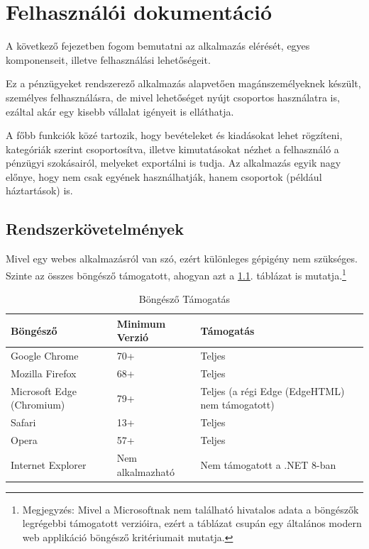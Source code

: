 \chapter{Felhasználói dokumentáció}
\label{ch:user}

A következő fejezetben fogom bemutatni az alkalmazás elérését, egyes komponenseit, illetve felhasználási lehetőségeit. 

Ez a pénzügyeket rendszerező alkalmazás alapvetően magánszemélyeknek készült, személyes felhasználásra, de mivel lehetőséget nyújt csoportos használatra is, ezáltal akár egy kisebb vállalat igényeit is elláthatja.

A főbb funkciók közé tartozik, hogy bevételeket és kiadásokat lehet rögzíteni, kategóriák szerint csoportosítva, illetve kimutatásokat nézhet a felhasználó a pénzügyi szokásairól, melyeket exportálni is tudja. Az alkalmazás egyik nagy előnye, hogy nem csak egyének használhatják, hanem csoportok (például háztartások) is.


\section{Rendszerkövetelmények}

Mivel egy webes alkalmazásról van szó, ezért különleges gépigény nem szükséges. Szinte az összes böngésző támogatott, ahogyan azt a \ref{tab:browsers}. táblázat is mutatja.\footnote{Megjegyzés: Mivel a Microsoftnak nem található hivatalos adata a böngészők legrégebbi támogatott verzióira, ezért a táblázat csupán egy általános modern web applikáció böngésző kritériumait mutatja.}
\begin{table}[H]
	\centering
	\begin{tabular}{ | m{} | m{} | m{} | }
		\hline
		\textbf{Böngésző} & \textbf{Minimum Verzió} & \textbf{Támogatás} \\
		\hline
		Google Chrome & 70+ & Teljes \\
		\hline
		Mozilla Firefox & 68+ & Teljes \\
		\hline
		Microsoft Edge (Chromium) & 79+ & Teljes (a régi Edge (EdgeHTML) nem támogatott) \\
		\hline
		Safari & 13+ & Teljes \\
		\hline
		Opera & 57+ & Teljes \\
		\hline
		Internet Explorer & Nem alkalmazható & Nem támogatott a .NET 8-ban \\
		\hline
	\end{tabular}
	\caption{Böngésző Támogatás}
	\label{tab:browsers}
\end{table}

